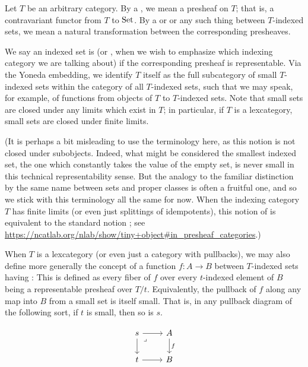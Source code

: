 Let $T$ be an arbitrary category. By a , we mean a presheaf on $T$; that is, a contravariant functor from $T$ to $\mathrm{Set}$. By a  or  or any such thing between $T$-indexed sets, we mean a natural transformation between the corresponding presheaves.

We say an indexed set is  (or , when we wish to emphasize which indexing category we are talking about) if the corresponding presheaf is representable. Via the Yoneda embedding, we identify $T$ itself as the full subcategory of small $T$-indexed sets within the category of all $T$-indexed sets, such that we may speak, for example, of functions from objects of $T$ to $T$-indexed sets. Note that small sets are closed under any limits which exist in $T$; in particular, if $T$ is a lexcategory, small sets are closed under finite limits.

(It is perhaps a bit misleading to use the terminology  here, as this notion is not closed under subobjects. Indeed, what might be considered the smallest indexed set, the one which constantly takes the value of the empty set, is never small in this technical representability sense. But the analogy to the familiar distinction by the same name between sets and proper classes is often a fruitful one, and so we stick with this terminology all the same for now. When the indexing category $T$ has finite limits (or even just splittings of idempotents), this notion of  is equivalent to the standard notion ; see \url{https://ncatlab.org/nlab/show/tiny+object#in_presheaf_categories}.)

When $T$ is a lexcategory (or even just a category with pullbacks), we may also define more generally the concept of a function $f : A \to B$ between $T$-indexed sets having : This is defined as every fiber of $f$ over every $t$-indexed element of $B$ being a representable presheaf over $T/t$. Equivalently, the pullback of $f$ along any map into $B$ from a small set is itself small. That is, in any pullback diagram of the following sort, if $t$ is small, then so is $s$.

\[\begin{tikzcd}
	s & A \\
	t & B
	\arrow["f", from=1-2, to=2-2]
	\arrow[from=2-1, to=2-2]
	\arrow[from=1-1, to=2-1]
	\arrow[from=1-1, to=1-2]
	\arrow["\lrcorner"{anchor=center, pos=0.125}, draw=none, from=1-1, to=2-2]
\end{tikzcd}\]

